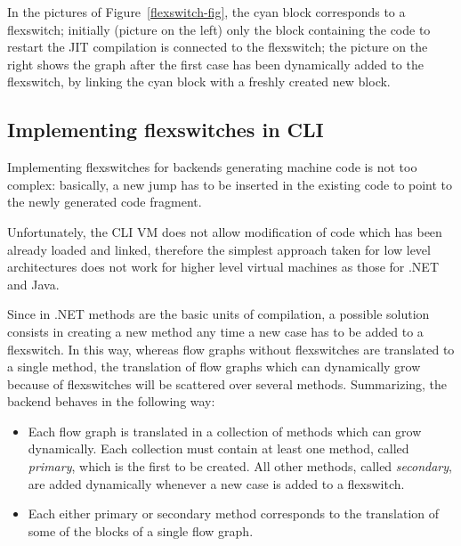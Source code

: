 In the pictures of Figure~\ref{flexswitch-fig}, the cyan block
corresponds to a flexswitch; initially (picture on the left) 
only the block containing the code to restart the JIT compilation
is connected to the flexswitch; the picture on the right
shows the graph after the first case has been dynamically added to the flexswitch,
by linking the cyan block with a freshly created new block.


\subsection{Implementing flexswitches in CLI}

Implementing flexswitches for backends generating machine code is
not too complex: basically, a new jump has to be inserted in the
existing code to point to the newly generated code fragment.

Unfortunately, the CLI VM does not allow modification of code which
has been already loaded and linked, therefore the simplest approach
taken for low level architectures does not work for higher level 
virtual machines as those for .NET and Java.

Since in .NET methods are the basic units of compilation, a possible
solution consists in creating a new method 
any time a new case has to be added to a flexswitch.
In this way, whereas flow graphs without flexswitches are translated
to a single method, the translation of flow graphs which can dynamically grow because of
flexswitches will be scattered over several methods.
Summarizing, the backend behaves in the following way:
\begin{itemize}
\item Each flow graph is translated in a collection of methods which
  can grow dynamically.  Each collection must contain at least one
  method, called \emph{primary}, which is the first to be created.
  All other methods, called \emph{secondary}, are added dynamically 
  whenever a new case is added to a flexswitch.

\item Each either primary or secondary method corresponds to the
  translation of some of the blocks of a single flow graph. 
\end{itemize} 

